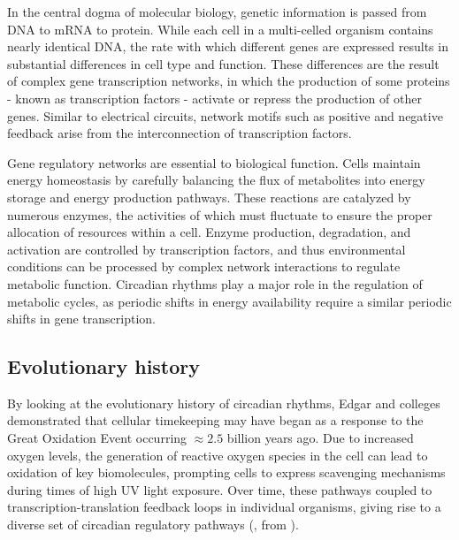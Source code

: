 In the central dogma of molecular biology, genetic information is passed from DNA to mRNA to protein. 
While each cell in a multi-celled organism contains nearly identical DNA, the rate with which different genes are expressed results in substantial differences in cell type and function. 
These differences are the result of complex gene transcription networks, in which the production of some proteins - known as transcription factors - activate or repress the production of other genes. 
Similar to electrical circuits, network motifs such as positive and negative feedback arise from the interconnection of transcription factors.

Gene regulatory networks are essential to biological function. 
Cells maintain energy homeostasis by carefully balancing the flux of metabolites into energy storage and energy production pathways. 
These reactions are catalyzed by numerous enzymes, the activities of which must fluctuate to ensure the proper allocation of resources within a cell.
Enzyme production, degradation, and activation are controlled by transcription factors, and thus environmental conditions can be processed by complex network interactions to regulate metabolic function.
Circadian rhythms play a major role in the regulation of metabolic cycles, as periodic shifts in energy availability require a similar periodic shifts in gene transcription.



\subsection{Evolutionary history}

By looking at the evolutionary history of circadian rhythms, Edgar and colleges \cite{Edgar2012} demonstrated that cellular timekeeping may have began as a response to the Great Oxidation Event occurring $\approx 2.5$ billion years ago. 
Due to increased oxygen levels, the generation of reactive oxygen species in the cell can lead to oxidation of key biomolecules, prompting cells to express scavenging mechanisms during times of high UV light exposure. 
Over time, these pathways coupled to transcription-translation feedback loops in individual organisms, giving rise to a diverse set of circadian regulatory pathways (, from \cite{Edgar2012}). 

